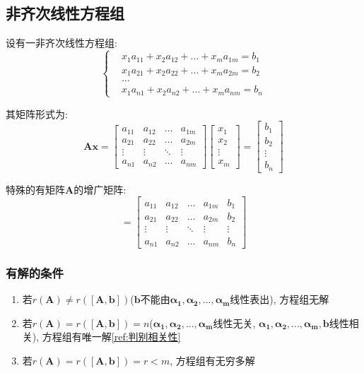 \subsection{非齐次线性方程组}
设有一非齐次线性方程组:
\begin{equation*}
\left\{\begin{aligned}
& x_{1}a_{11}+x_{2}a_{12}+...+x_{m}a_{1m}=b_{1} \\
& x_{1}a_{21}+x_{2}a_{22}+...+x_{m}a_{2m}=b_{2} \\
& \dots \\
& x_{1}a_{n1}+x_{2}a_{n2}+...+x_{m}a_{nm}=b_{n}
\end{aligned}
\right.
\end{equation*}\par
其矩阵形式为:
\begin{equation*}
\bm{A}\bm{x}=\begin{bmatrix}
a_{11} & a_{12} & \dots & a_{1m} \\
a_{21} & a_{22} & \dots & a_{2m} \\
\vdots & \vdots & \ddots & \vdots \\
a_{n1} & a_{n2} & \dots & a_{nm}
\end{bmatrix}
\begin{bmatrix}
x_{1} \\
x_{2} \\
\vdots \\
x_{m}
\end{bmatrix}=
\begin{bmatrix}
b_{1} \\
b_{2} \\
\vdots \\
b_{n}
\end{bmatrix}
\end{equation*}\par
特殊的有矩阵$ \bm{A} $的增广矩阵:
\begin{equation*}
[\bm{A},\bm{b}]=\begin{bmatrix}
a_{11} & a_{12} & \dots & a_{1m} & b_{1} \\
a_{21} & a_{22} & \dots & a_{2m} & b_{2} \\
\vdots & \vdots & \ddots & \vdots & \vdots \\
a_{n1} & a_{n2} & \dots & a_{nm} & b_{n}
\end{bmatrix}
\end{equation*}
\subsubsection{有解的条件}
\begin{enumerate}
\item 若$ r(\bm{A})\neq r([\bm{A},\bm{b}]) $($ \bm{b} $不能由$ \bm{\alpha_{1}},\bm{\alpha_{2}},...,\bm{\alpha_{m}} $线性表出), 方程组无解
\item 若$ r(\bm{A})=r([\bm{A},\bm{b}])=n $($ \bm{\alpha_{1}},\bm{\alpha_{2}},...,\bm{\alpha_{m}} $线性无关, $ \bm{\alpha_{1}},\bm{\alpha_{2}},...,\bm{\alpha_{m}},\bm{b} $线性相关), 方程组有唯一解\ref{ref:判别相关性}
\item 若$ r(\bm{A})=r([\bm{A},\bm{b}])=r<m $, 方程组有无穷多解
\end{enumerate}
